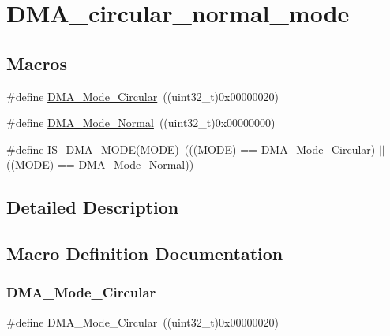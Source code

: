 \hypertarget{group___d_m_a__circular__normal__mode}{}\section{D\+M\+A\+\_\+circular\+\_\+normal\+\_\+mode}
\label{group___d_m_a__circular__normal__mode}
\subsection*{Macros}
\begin{DoxyCompactItemize}
\item 
\#define \mbox{\hyperlink{group___d_m_a__circular__normal__mode_ga36327b14c302098fbc5823ac3f1ae020}{D\+M\+A\+\_\+\+Mode\+\_\+\+Circular}}~((uint32\+\_\+t)0x00000020)
\item 
\#define \mbox{\hyperlink{group___d_m_a__circular__normal__mode_ga36400f5b5095f1102ede4760d7a5959c}{D\+M\+A\+\_\+\+Mode\+\_\+\+Normal}}~((uint32\+\_\+t)0x00000000)
\item 
\#define \mbox{\hyperlink{group___d_m_a__circular__normal__mode_gad88ee5030574d6a573904378fb62c7ac}{I\+S\+\_\+\+D\+M\+A\+\_\+\+M\+O\+DE}}(M\+O\+DE)~(((M\+O\+DE) == \mbox{\hyperlink{group___d_m_a__circular__normal__mode_ga36327b14c302098fbc5823ac3f1ae020}{D\+M\+A\+\_\+\+Mode\+\_\+\+Circular}}) $\vert$$\vert$ ((M\+O\+DE) == \mbox{\hyperlink{group___d_m_a__circular__normal__mode_ga36400f5b5095f1102ede4760d7a5959c}{D\+M\+A\+\_\+\+Mode\+\_\+\+Normal}}))
\end{DoxyCompactItemize}


\subsection{Detailed Description}


\subsection{Macro Definition Documentation}
\mbox{\label{group___d_m_a__circular__normal__mode_ga36327b14c302098fbc5823ac3f1ae020}} 
\subsubsection{\texorpdfstring{DMA\_Mode\_Circular}{DMA\_Mode\_Circular}}
{\footnotesize\ttfamily \#define D\+M\+A\+\_\+\+Mode\+\_\+\+Circular~((uint32\+\_\+t)0x00000020)}

